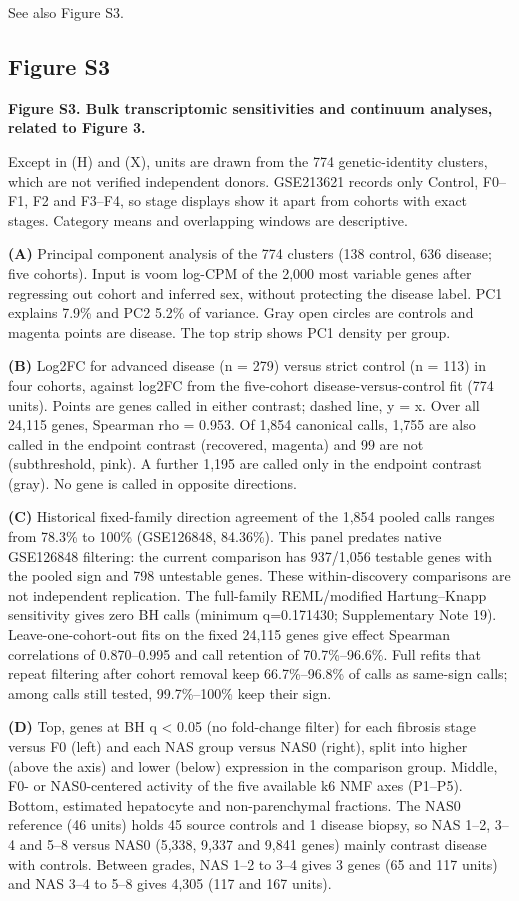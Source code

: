 See also Figure S3.

\subsection{Figure S3}\label{figure-s3}

\textbf{Figure S3. Bulk transcriptomic sensitivities and continuum analyses, related to Figure 3.}

Except in (H) and (X), units are drawn from the 774 genetic-identity clusters, which are not verified independent donors. GSE213621 records only Control, F0--F1, F2 and F3--F4, so stage displays show it apart from cohorts with exact stages. Category means and overlapping windows are descriptive.

\textbf{(A)} Principal component analysis of the 774 clusters (138 control, 636 disease; five cohorts). Input is voom log-CPM of the 2,000 most variable genes after regressing out cohort and inferred sex, without protecting the disease label. PC1 explains 7.9\% and PC2 5.2\% of variance. Gray open circles are controls and magenta points are disease. The top strip shows PC1 density per group.

\textbf{(B)} Log2FC for advanced disease (n = 279) versus strict control (n = 113) in four cohorts, against log2FC from the five-cohort disease-versus-control fit (774 units). Points are genes called in either contrast; dashed line, y = x. Over all 24,115 genes, Spearman rho = 0.953. Of 1,854 canonical calls, 1,755 are also called in the endpoint contrast (recovered, magenta) and 99 are not (subthreshold, pink). A further 1,195 are called only in the endpoint contrast (gray). No gene is called in opposite directions.

\textbf{(C)} Historical fixed-family direction agreement of the 1,854 pooled calls ranges from 78.3\% to 100\% (GSE126848, 84.36\%). This panel predates native GSE126848 filtering: the current comparison has 937/1,056 testable genes with the pooled sign and 798 untestable genes. These within-discovery comparisons are not independent replication. The full-family REML/modified Hartung--Knapp sensitivity gives zero BH calls (minimum q=0.171430; Supplementary Note 19). Leave-one-cohort-out fits on the fixed 24,115 genes give effect Spearman correlations of 0.870--0.995 and call retention of 70.7\%--96.6\%. Full refits that repeat filtering after cohort removal keep 66.7\%--96.8\% of calls as same-sign calls; among calls still tested, 99.7\%--100\% keep their sign.

\textbf{(D)} Top, genes at BH q \textless{} 0.05 (no fold-change filter) for each fibrosis stage versus F0 (left) and each NAS group versus NAS0 (right), split into higher (above the axis) and lower (below) expression in the comparison group. Middle, F0- or NAS0-centered activity of the five available k6 NMF axes (P1--P5). Bottom, estimated hepatocyte and non-parenchymal fractions. The NAS0 reference (46 units) holds 45 source controls and 1 disease biopsy, so NAS 1--2, 3--4 and 5--8 versus NAS0 (5,338, 9,337 and 9,841 genes) mainly contrast disease with controls. Between grades, NAS 1--2 to 3--4 gives 3 genes (65 and 117 units) and NAS 3--4 to 5--8 gives 4,305 (117 and 167 units).

